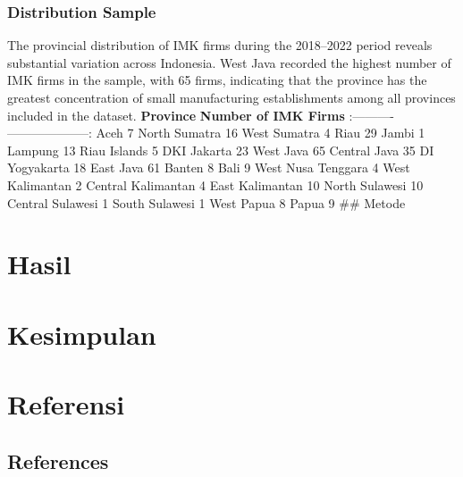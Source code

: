 \documentclass[
  manuscript=article,
  layout=publish,
  year=2026,
  volume=1,
]{den}
\begin{document}
\subsubsection{Distribution Sample}\label{distribution-sample}

The provincial distribution of IMK firms during the 2018--2022 period
reveals substantial variation across Indonesia. West Java recorded the
highest number of IMK firms in the sample, with 65 firms, indicating
that the province has the greatest concentration of small manufacturing
establishments among all provinces included in the dataset. \textbar{}
\textbf{Province} \textbar{} \textbf{Number of IMK Firms} \textbar{}
\textbar:----------\textbar--------------------:\textbar{} \textbar{}
Aceh \textbar{} 7 \textbar{} \textbar{} North Sumatra \textbar{} 16
\textbar{} \textbar{} West Sumatra \textbar{} 4 \textbar{} \textbar{}
Riau \textbar{} 29 \textbar{} \textbar{} Jambi \textbar{} 1 \textbar{}
\textbar{} Lampung \textbar{} 13 \textbar{} \textbar{} Riau Islands
\textbar{} 5 \textbar{} \textbar{} DKI Jakarta \textbar{} 23 \textbar{}
\textbar{} West Java \textbar{} 65 \textbar{} \textbar{} Central Java
\textbar{} 35 \textbar{} \textbar{} DI Yogyakarta \textbar{} 18
\textbar{} \textbar{} East Java \textbar{} 61 \textbar{} \textbar{}
Banten \textbar{} 8 \textbar{} \textbar{} Bali \textbar{} 9 \textbar{}
\textbar{} West Nusa Tenggara \textbar{} 4 \textbar{} \textbar{} West
Kalimantan \textbar{} 2 \textbar{} \textbar{} Central Kalimantan
\textbar{} 4 \textbar{} \textbar{} East Kalimantan \textbar{} 10
\textbar{} \textbar{} North Sulawesi \textbar{} 10 \textbar{} \textbar{}
Central Sulawesi \textbar{} 1 \textbar{} \textbar{} South Sulawesi
\textbar{} 1 \textbar{} \textbar{} West Papua \textbar{} 8 \textbar{}
\textbar{} Papua \textbar{} 9 \textbar{} \#\# Metode

\section{Hasil}\label{hasil}

\section{Kesimpulan}\label{kesimpulan}

\section{Referensi}\label{referensi}

\subsection{References}\label{references}
\end{document}
